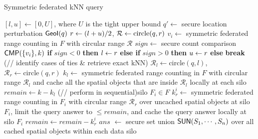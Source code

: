 \setlength{\textfloatsep}{1ex}
\setlength{\floatsep}{1ex}
\begin{algorithm}[t]
	\caption{\small{Symmetric federated kNN query}}\label{alg:tie-knn}
    $[l,u] \gets [0,U]$, where $U$ is the tight upper bound\;
    $q' \gets$ secure location perturbation $\textsf{GeoI}(q)$\;
     {
        $r \leftarrow (l+u)/2$, $\mathcal{R} \gets \text{circle}(q, r)$\;
        $v_i \gets$ symmetric federated range counting in $F$ with circular range $\mathcal{R}$\; 
        $sign \gets$ secure count comparison $\textsf{CMP}(\{v_i\}, k)$\;
        \textbf{if} $sign < 0$ \textbf{then} $l \leftarrow r$\;
        \textbf{else if} $sign > 0$ \textbf{then} $u \leftarrow r$\;
        \textbf{else} \textbf{break}\;
    }
    \Else(// identify cases of ties \& retrieve exact kNN){
        $\mathcal{R}_l \gets \text{circle}(q, l)$,
        $\mathcal{R}_r \gets \text{circle}(q, r)$\;
        $k_{l} \gets$ symmetric federated range counting in $F$ with circular range $\mathcal{R}_l$ and cache all the spatial objects that are inside $\mathcal{R}_l$ locally at each silo\;
        $remain \gets k - k_{l}$\; 
        \ForEach(// perform in sequential){silo $F_i \in F$}{ 
            $k_r^i \gets$ symmetric federated range counting in $F_i$ with circular range $\mathcal{R}_r$ over uncached spatial objects at silo $F_i$, limit the query answer to $\le remain$, and cache the query answer locally at silo $F_i$\;
            $remain \gets remain - k_r^i$\;
        }
        $ans$ $\gets$ secure set union $\textsf{SUN}(S_1,\cdots,S_n)$ over all cached spatial objects within each data silo\;
    }
    \;
\end{algorithm}
\afterpage{\global\setlength{\textfloatsep}{\oldtextfloatsep}}
\afterpage{\global\setlength{\floatsep}{\oldfloatsep}}

